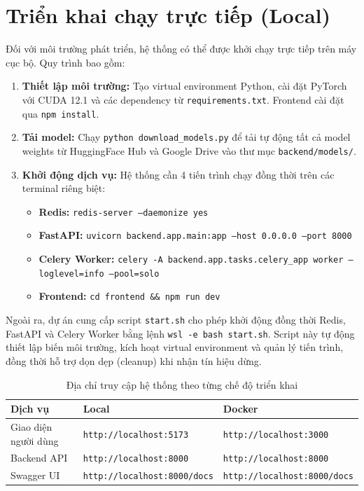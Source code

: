 \documentclass[../main.tex]{subfiles}
\begin{document}
\section{Triển khai chạy trực tiếp (Local)}

Đối với môi trường phát triển, hệ thống có thể được khởi chạy trực tiếp trên máy cục bộ. Quy trình bao gồm:

\begin{enumerate}
    \item \textbf{Thiết lập môi trường:} Tạo virtual environment Python, cài đặt PyTorch với CUDA 12.1 và các dependency từ \texttt{requirements.txt}. Frontend cài đặt qua \texttt{npm install}.
    \item \textbf{Tải model:} Chạy \texttt{python download\_models.py} để tải tự động tất cả model weights từ HuggingFace Hub và Google Drive vào thư mục \texttt{backend/models/}.
    \item \textbf{Khởi động dịch vụ:} Hệ thống cần 4 tiến trình chạy đồng thời trên các terminal riêng biệt:
    \begin{itemize}
        \item \textbf{Redis:} \texttt{redis-server --daemonize yes}
        \item \textbf{FastAPI:} \texttt{uvicorn backend.app.main:app --host 0.0.0.0 --port 8000}
        \item \textbf{Celery Worker:} \texttt{celery -A backend.app.tasks.celery\_app worker --loglevel=info --pool=solo}
        \item \textbf{Frontend:} \texttt{cd frontend \&\& npm run dev}
    \end{itemize}
\end{enumerate}

Ngoài ra, dự án cung cấp script \texttt{start.sh} cho phép khởi động đồng thời Redis, FastAPI và Celery Worker bằng lệnh \texttt{wsl -e bash start.sh}. Script này tự động thiết lập biến môi trường, kích hoạt virtual environment và quản lý tiến trình, đồng thời hỗ trợ dọn dẹp (cleanup) khi nhận tín hiệu dừng.

\begin{table}[H]
    \centering
    \caption{Địa chỉ truy cập hệ thống theo từng chế độ triển khai}
    \label{tab:access-urls}
    \begin{tabularx}{\textwidth}{|>{\raggedright\arraybackslash}p{3.5cm}|>{\raggedright\arraybackslash}p{5.5cm}|X|}
        \hline
        \textbf{Dịch vụ} & \textbf{Local} & \textbf{Docker} \\
        \hline
        Giao diện người dùng & \texttt{http://localhost:5173} & \texttt{http://localhost:3000} \\
        \hline
        Backend API & \texttt{http://localhost:8000} & \texttt{http://localhost:8000} \\
        \hline
        Swagger UI & \texttt{http://localhost:8000/docs} & \texttt{http://localhost:8000/docs} \\
        \hline
    \end{tabularx}
\end{table}
\end{document}
